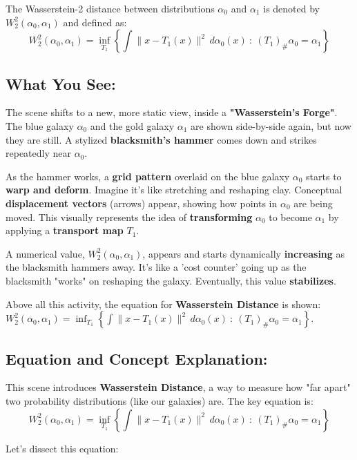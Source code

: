 \documentclass{article}
\begin{document}
\noindent The Wasserstein-2 distance between distributions \( \alpha_0 \) and \( \alpha_1 \) is denoted by \( W_2^2(\alpha_0, \alpha_1) \) and defined as:
\[
W_2^2(\alpha_0, \alpha_1) = \inf_{T_1} \left\{ \int \|x - T_1(x)\|^2 \, d\alpha_0(x) \ : \ (T_1)_\# \alpha_0 = \alpha_1 \right\}
\]

\subsection*{What You See:}

The scene shifts to a new, more static view, inside a \textbf{"Wasserstein's Forge"}.  The blue galaxy \( \alpha_0 \) and the gold galaxy \( \alpha_1 \) are shown side-by-side again, but now they are still.  A stylized \textbf{blacksmith's hammer} comes down and strikes repeatedly near \( \alpha_0 \).

As the hammer works, a \textbf{grid pattern} overlaid on the blue galaxy \( \alpha_0 \) starts to \textbf{warp and deform}.  Imagine it's like stretching and reshaping clay. Conceptual \textbf{displacement vectors} (arrows) appear, showing how points in \( \alpha_0 \) are being moved.  This visually represents the idea of \textbf{transforming} \( \alpha_0 \) to become \( \alpha_1 \) by applying a \textbf{transport map} \( T_1 \).

A numerical value, \textbf{\( W_2^2(\alpha_0, \alpha_1) \)}, appears and starts dynamically \textbf{increasing} as the blacksmith hammers away.  It's like a 'cost counter' going up as the blacksmith "works" on reshaping the galaxy. Eventually, this value \textbf{stabilizes}.

Above all this activity, the equation for \textbf{Wasserstein Distance} is shown: \( W_2^2(\alpha_0, \alpha_1) = \inf_{T_1} \left\{ \int \|x - T_1(x)\|^2 \, d\alpha_0(x) \ : \ (T_1)_\# \alpha_0 = \alpha_1 \right\} \).

\subsection*{Equation and Concept Explanation: }

This scene introduces \textbf{Wasserstein Distance}, a way to measure how "far apart" two probability distributions (like our galaxies) are.  The key equation is:
\[
W_2^2(\alpha_0, \alpha_1) = \inf_{T_1} \left\{ \int \|x - T_1(x)\|^2 \, d\alpha_0(x) \ : \ (T_1)_\# \alpha_0 = \alpha_1 \right\}
\]

Let's dissect this equation:
\end{document}

